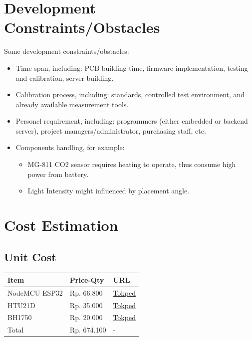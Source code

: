 \documentclass[a4paper,12pt,oneside,pdflatex,italian,final,twocolumn]{article}
\begin{document}
	\raggedright
	\section{Development Constraints/Obstacles}

	Some development constraints/obstacles:

	\begin{itemize}
		\item Time span, including: PCB building time, firmware implementation, testing and calibration, server building.

		\item Calibration process, including: standards, controlled test environment, and already available measurement tools.

		\item Personel requirement, including: programmers (either embedded or backend server), project managers/administrator, purchasing staff, etc.

		\item Components handling, for example:

		\begin{itemize}
			\item MG-811 CO2 sensor requires heating to operate, thus consume high power from battery.

			\item Light Intensity might influenced by placement angle.
		\end{itemize}

	\end{itemize}

	\raggedright
	\section{Cost Estimation}

	\subsection{Unit Cost}

	\begin{tabular}{|l|l|l|}
		\toprule
		Item & Price-Qty & URL \\
		\midrule
		NodeMCU ESP32 & Rp. 66.800 & \href{https://www.tokopedia.com/temins/esp32-esp-32-arduino-wifi-bluetooth-iot-development-board-micro-usb}{Tokped} \\
		HTU21D & Rp. 35.000 & \href{https://www.tokopedia.com/akhishop/htu21d-temperature-and-humidity-sensor-module}{Tokped} \\
		BH1750 & Rp. 20.000 & \href{https://www.tokopedia.com/akhishop/gy-302-light-intensity-bh1750-module-sensor-intensitas-cahaya}{Tokped} \\
		\midrule
		Total & Rp. 674.100  & - \\
		\bottomrule
	\end{tabular}
\end{document}
